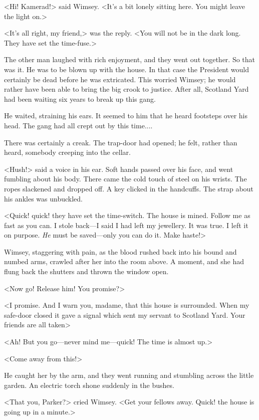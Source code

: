 <Hi! Kamerad!> said Wimsey. <It's a bit lonely sitting here. You might leave the light on.>

<It's all right, my friend,> was the reply. <You will not be in the dark long. They have set the time-fuse.>

The other man laughed with rich enjoyment, and they went out together. So that was it. He was to be blown up with the house. In that case the President would certainly be dead before he was extricated. This worried Wimsey; he would rather have been able to bring the big crook to justice. After all, Scotland Yard had been waiting six years to break up this gang.

He waited, straining his ears. It seemed to him that he heard footsteps over his head. The gang had all crept out by this time....

There was certainly a creak. The trap-door had opened; he felt, rather than heard, somebody creeping into the cellar.

<Hush!> said a voice in his ear. Soft hands passed over his face, and went fumbling about his body. There came the cold touch of steel on his wrists. The ropes slackened and dropped off. A key clicked in the handcuffs. The strap about his ankles was unbuckled.

<Quick! quick! they have set the time-switch. The house is mined. Follow me as fast as you can. I stole back—I said I had left my jewellery. It was true. I left it on purpose. \emph{He} must be saved—only you can do it. Make haste!>

Wimsey, staggering with pain, as the blood rushed back into his bound and numbed arms, crawled after her into the room above. A moment, and she had flung back the shutters and thrown the window open.

<Now go! Release him! You promise?>

<I promise. And I warn you, madame, that this house is surrounded. When my safe-door closed it gave a signal which sent my servant to Scotland Yard. Your friends are all taken\longdash>

<Ah! But you go—never mind me—quick! The time is almost up.>

<Come away from this!>

He caught her by the arm, and they went running and stumbling across the little garden. An electric torch shone suddenly in the bushes.

<That you, Parker?> cried Wimsey. <Get your fellows away. Quick! the house is going up in a minute.>

